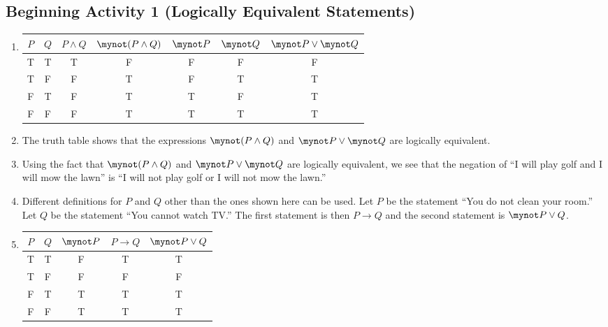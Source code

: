 \documentclass[11pt]{article}
\begin{document}
\subsection*{Beginning Activity 1 (Logically Equivalent Statements)}
\begin{enumerate}

\item 
\begin{tabular}[t]{| c | c || c | c | c | c | c |}  \hline
$P$  &  $Q$  &  $P \wedge Q$  &  $\mynot  ( {P \wedge Q} )$  &  $\mynot P$  &  
$\mynot Q$  &  $\mynot  P \vee \mynot  Q$ \\ \hline
T  &  T  &  T  &  F  &  F  &  F  &  F  \\ \hline
T  &  F  &  F  &  T  &  F  &  T  &  T  \\ \hline
F  &  T  &  F  &  T  &  T  &  F  &  T  \\ \hline
F  &  F  &  F  &  T  &  T  &  T  &  T  \\ \hline
\end{tabular}

\item The truth table shows that the expressions $\mynot  ( {P \wedge Q} )$ and 
$\mynot  P \vee \mynot  Q$ are logically equivalent.

\item Using the fact that $\mynot  ( {P \wedge Q} )$ and $\mynot  P \vee \mynot  Q$ are logically equivalent, we see that the negation of ``I will play golf and I will mow the lawn'' is ``I will not play golf or I will not mow the lawn.''

\item Different definitions for  $P$ and  $Q$  other than the ones shown here can be used.
Let  $P$  be the statement ``You do not clean your room.''  Let  $Q$  be the statement  ``You cannot watch TV.''
The first statement is then $P \to Q$  and the second statement is  $\mynot P \vee Q$. 
\item 
\begin{tabular}[t]{| c | c || c | c | c |}  \hline
$P$  &  $Q$  &  $\mynot P$  &  $P \to Q$  &  $\mynot P \vee Q$ \\ \hline
T  &  T  &  F  &  T  &  T  \\ \hline
T  &  F  &  F  &  F  &  F  \\ \hline
F  &  T  &  T  &  T  &  T  \\ \hline
F  &  F  &  T  &  T  &  T  \\ \hline
\end{tabular}


\end{enumerate}
\end{document}
